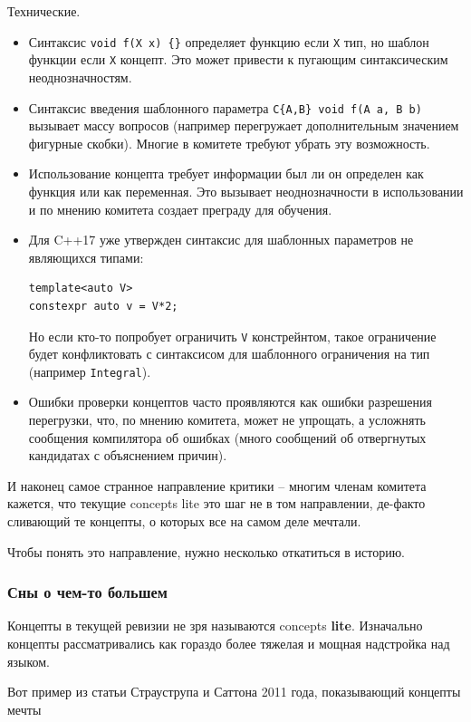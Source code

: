 \documentclass[a4paper,12pt,oneside]{article}
\begin{document}
Технические.

\begin{itemize}
\item Синтаксис \lstinline!void f(X x) {}! определяет функцию если \lstinline!X! тип, но шаблон функции если \lstinline!X! концепт. Это может привести к пугающим синтаксическим неоднозначностям.
\item Синтаксис введения шаблонного параметра \lstinline!C{A,B} void f(A a, B b)! вызывает массу вопросов (например перегружает дополнительным значением фигурные скобки). Многие в комитете требуют убрать эту возможность.
\item Использование концепта требует информации был ли он определен как функция или как переменная. Это вызывает неоднозначности в использовании и по мнению комитета создает преграду для обучения.
\item Для C++17 уже утвержден синтаксис для шаблонных параметров не являющихся типами:
\begin{lstlisting}
template<auto V>
constexpr auto v = V*2;
\end{lstlisting}
Но если кто-то попробует ограничить \lstinline!V! констрейнтом, такое ограничение будет конфликтовать с синтаксисом для шаблонного ограничения на тип (например \lstinline!Integral!).
\item Ошибки проверки концептов часто проявляются как ошибки разрешения перегрузки, что, по мнению комитета, может не упрощать, а усложнять сообщения компилятора об ошибках (много сообщений об отвергнутых кандидатах с объяснением причин).
\end{itemize}

И наконец самое странное направление критики -- многим членам комитета кажется, что текущие concepts lite это шаг не в том направлении, де-факто сливающий те концепты, о которых все на самом деле мечтали.

Чтобы понять это направление, нужно несколько откатиться в историю.

\subsubsection{Сны о чем-то большем}\label{BetterConstraints}

Концепты в текущей ревизии не зря называются concepts \textbf{lite}. Изначально концепты рассматривались как гораздо более тяжелая и мощная надстройка над языком.

Вот пример из статьи Страуструпа и Саттона 2011 года, показывающий концепты мечты
\end{document}
